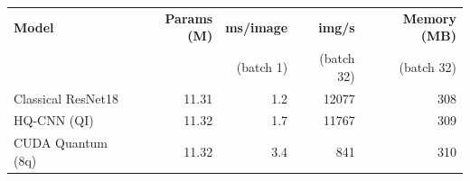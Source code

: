 \begin{tabular}{lrrrr}
\toprule
\textbf{Model} & \textbf{Params (M)} & \textbf{ms/image} & \textbf{img/s} & \textbf{Memory (MB)} \\
 &  & (batch 1) & (batch 32) & (batch 32) \\
\midrule
Classical ResNet18 & 11.31 & 1.2 & 12077 & 308 \\
HQ-CNN (QI) & 11.32 & 1.7 & 11767 & 309 \\
CUDA Quantum (8q) & 11.32 & 3.4 & 841 & 310 \\
\bottomrule
\end{tabular}
